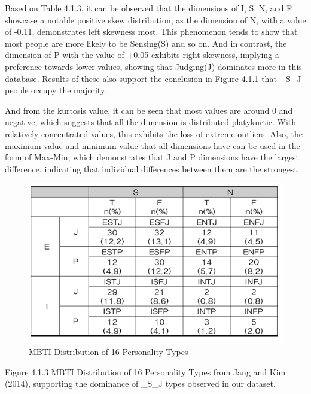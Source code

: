 \documentclass[12pt]{article}
\begin{document}
	Based on Table 4.1.3, it can be observed that the dimensions of I, S, N, and F showcase a notable positive skew distribution, as the dimension of N, with a value of -0.11, demonstrates left skewness most. This phenomenon tends to show that most people are more likely to be Sensing(S) and so on. And in contrast, the dimension of P with the value of +0.05 exhibits right skewness, implying a preference towards lower values, showing that Judging(J) dominates more in this database. Results of these also support the conclusion in Figure 4.1.1 that \_S\_J people occupy the majority.
	
	And from the kurtosis value, it can be seen that most values are around 0 and negative, which suggests that all the dimension is distributed platykurtic. With relatively concentrated values, this exhibits the loss of extreme outliers. Also, the maximum value and minimum value that all dimensions have can be used in the form of Max-Min, which demonstrates that J and P dimensions have the largest difference, indicating that individual differences between them are the strongest.
	\begin{figure}[H]
		\centering
		\includegraphics{Q1EDA7} 
		\caption{MBTI Distribution of 16 Personality Types}		
	\end{figure}
	
	Figure 4.1.3 MBTI Distribution of 16 Personality Types from Jang and Kim (2014), supporting the dominance of \_S\_J types observed in our dataset. 
	
\end{document}

